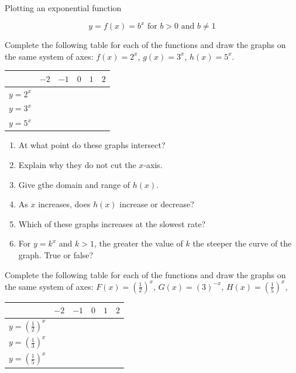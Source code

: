 \begin{wex}{Plotting an exponential function}
 {
\begin{equation*} y=f(x) =b^{x} \mbox{ for } b>0 \mbox{ and } b \neq 1 \end{equation*}

Complete the following table for each of the functions and draw the graphs on the same system of axes:
$f(x)=2^{x}$, $g(x)=3^{x}$, $h(x)=5^{x}$.


\begin{table}[H]
\begin{center}
\begin{tabular}{|c|c|c|c|c|c|}
\hline
   &  $-2$ & $-1$ & $0$ & $1$ & $2$ 
\\ \hline
 $y=2^{x}$&  &&&&
\\ \hline
 $y=3^{x}$&  &&&&
\\ \hline
 $y=5^{x}$&  &&&&
\\ \hline

\end{tabular}
\end{center}
\end{table}

\begin{enumerate}[noitemsep, label=\textbf{\arabic*}. ] 
 \item At what point do these graphs intersect?
\item Explain why they do not cut the $x$-axis.
\item Give gthe domain and range of $h(x)$.
 \item As $x$ increases, does $h(x)$ increase or decrease?
\item Which of these graphs increases at the slowest rate?
\item For $y=k^{x}$ and $k>1$, the greater the value of $k$ the steeper the curve of the graph. True or false?
\end{enumerate}

Complete the following table for each of the functions and draw the graphs on the same system of axes:
$F(x) =(\frac{1}{2})^{x}$, $G(x) =(3)^{-x}$, $H(x) =(\frac{1}{5})^{x}$, 
\begin{table}[H]
\begin{center}
\begin{tabular}{|c|c|c|c|c|c|}
\hline
   &  $-2$ & $-1$ & $0$ & $1$ & $2$ 
\\ \hline
 $y=(\frac{1}{2})^{x}$&  &&&&
\\ \hline
$y=(\frac{1}{3})^{x}$&  &&&&
\\ \hline
$y=(\frac{1}{5})^{x}$&  &&&&
\\ \hline


\end{tabular}
\end{center}
\end{table}}
\end{wex}
